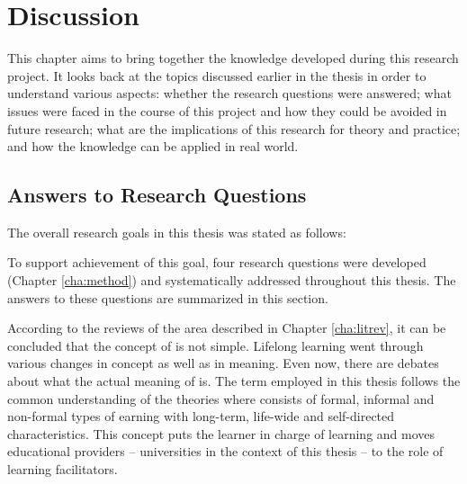 \chapter{Discussion\label{cha:discussion}}
This chapter aims to bring together the knowledge developed during this research
project. It looks back at the topics discussed earlier in the thesis in order to
understand various aspects: whether the research questions were answered; what
issues were faced in the course of this project and how they could be avoided in
future research; what are the implications of this research for theory and
practice; and how the knowledge can be applied in real world.


\section{Answers to Research Questions}

The overall research goals in this thesis was stated as follows:


To support achievement of this goal, four research questions were developed
(Chapter \ref{cha:method}) and systematically addressed throughout this thesis.
The answers to these questions are summarized in this section.


According to the reviews of the area described in Chapter \ref{cha:litrev}, it
can be concluded that the concept of \LLLs is not simple. Lifelong learning
went through various changes in concept as well as in meaning. Even now,
there are debates about what the actual meaning of \LLLs is. The term employed
in this thesis follows the common understanding of the theories where \LLLs
consists of formal, informal and non-formal types of  earning with long-term,
life-wide and self-directed characteristics. This concept puts the learner in
charge of learning and moves educational providers -- universities in the
context of this thesis -- to the role of learning facilitators.

